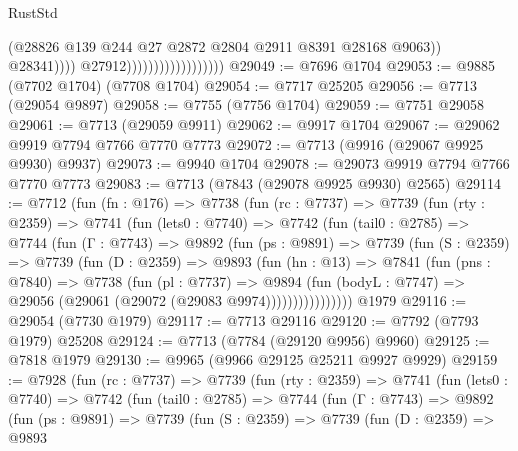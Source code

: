 \begin{lexlean}{RustStd}
\begin{coremodule}
                                                  (@28826
                                                    @139
                                                    @244
                                                    @27
                                                    @2872
                                                    @2804
                                                    @2911
                                                    @8391
                                                    @28168
                                                    @9063))
                                                @28341))))
                                        @27912))))))))))))))))))
@29049 := @7696 @1704
@29053 := @9885 (@7702 @1704) (@7708 @1704)
@29054 := @7717 @25205
@29056 := @7713 (@29054 @9897)
@29058 := @7755 (@7756 @1704)
@29059 := @7751 @29058
@29061 := @7713 (@29059 @9911)
@29062 := @9917 @1704
@29067 := @29062 @9919 @7794 @7766 @7770 @7773
@29072 := @7713 (@9916 (@29067 @9925 @9930) @9937)
@29073 := @9940 @1704
@29078 := @29073 @9919 @7794 @7766 @7770 @7773
@29083 := @7713 (@7843 (@29078 @9925 @9930) @2565)
@29114 := @7712
    (fun (fn : @176) =>
    @7738
      (fun (rc : @7737) =>
      @7739
        (fun (rty : @2359) =>
        @7741
          (fun (lets0 : @7740) =>
          @7742
            (fun (tail0 : @2785) =>
            @7744
              (fun (Γ : @7743) =>
              @9892
                (fun (ps : @9891) =>
                @7739
                  (fun (S : @2359) =>
                  @7739
                    (fun (D : @2359) =>
                    @9893
                      (fun (hn : @13) =>
                      @7841
                        (fun (pns : @7840) =>
                        @7738
                          (fun (pl : @7737) =>
                          @9894
                            (fun (bodyL : @7747) =>
                            @29056 (@29061 (@29072 (@29083 @9974))))))))))))))))
    @1979
@29116 := @29054 (@7730 @1979)
@29117 := @7713 @29116
@29120 := @7792 (@7793 @1979) @25208
@29124 := @7713 (@7784 (@29120 @9956) @9960)
@29125 := @7818 @1979
@29130 := @9965 (@9966 @29125 @25211 @9927 @9929)
@29159 := @7928
    (fun (rc : @7737) =>
    @7739
      (fun (rty : @2359) =>
      @7741
        (fun (lets0 : @7740) =>
        @7742
          (fun (tail0 : @2785) =>
          @7744
            (fun (Γ : @7743) =>
            @9892
              (fun (ps : @9891) =>
              @7739
                (fun (S : @2359) =>
                @7739
                  (fun (D : @2359) =>
                  @9893

\end{coremodule}
\end{lexlean}
